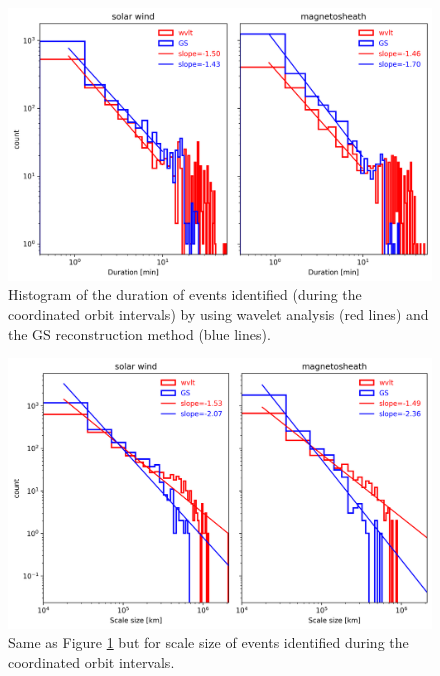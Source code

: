 \begin{figure}
    \centering
    \includegraphics[width=\textwidth]{Figures/Histograms/duration_coordinated.png}
    \caption[Histogram of duration from coordinated analysis]{Histogram of the duration of events identified (during the coordinated orbit intervals) by using wavelet analysis (red lines) and the GS reconstruction method (blue lines).}
    \label{fig:histogram-duration-coordinated}
\end{figure}

\begin{figure}
    \centering
    \includegraphics[width=\textwidth]{Figures/Histograms/scalesize_coordinated.png}
    \caption[Histogram of scale size from coordinated analysis]{Same as Figure \ref{fig:histogram-duration-coordinated} but for scale size of events identified during the coordinated orbit intervals.}
    \label{fig:histogram-scalesize-coordinated}
\end{figure}

